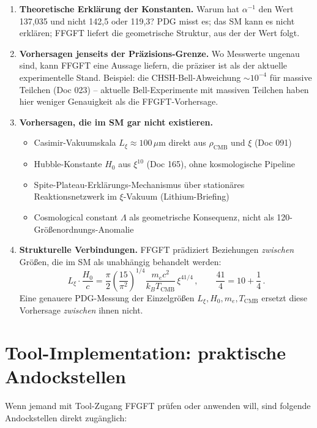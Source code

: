 \documentclass[11pt,a4paper]{article}
\begin{document}
\begin{enumerate}\itemsep2pt
\item \textbf{Theoretische Erklärung der Konstanten.} Warum hat $\alpha^{-1}$ den Wert 137,035 und nicht 142,5 oder 119,3? PDG misst es; das SM kann es nicht erklären; FFGFT liefert die geometrische Struktur, aus der der Wert folgt.

\item \textbf{Vorhersagen jenseits der Präzisions-Grenze.} Wo Messwerte ungenau sind, kann FFGFT eine Aussage liefern, die präziser ist als der aktuelle experimentelle Stand. Beispiel: die CHSH-Bell-Abweichung $\sim 10^{-4}$ für massive Teilchen (Doc 023) -- aktuelle Bell-Experimente mit massiven Teilchen haben hier weniger Genauigkeit als die FFGFT-Vorhersage.

\item \textbf{Vorhersagen, die im SM gar nicht existieren.}
\begin{itemize}\itemsep1pt
\item Casimir-Vakuumskala $L_\xi \approx 100\,\mu$m direkt aus $\rho_{\mathrm{CMB}}$ und $\xi$ (Doc 091)
\item Hubble-Konstante $H_0$ aus $\xi^{10}$ (Doc 165), ohne kosmologische Pipeline
\item Spite-Plateau-Erklärungs-Mechanismus über stationäres Reaktionsnetzwerk im $\xi$-Vakuum (Lithium-Briefing)
\item Cosmological constant $\Lambda$ als geometrische Konsequenz, nicht als 120-Größenordnungs-Anomalie
\end{itemize}

\item \textbf{Strukturelle Verbindungen.} FFGFT prädiziert Beziehungen \emph{zwischen} Größen, die im SM als unabhängig behandelt werden:
\[
L_\xi \cdot \frac{H_0}{c} = \frac{\pi}{2}\left(\frac{15}{\pi^2}\right)^{1/4}\frac{m_e c^2}{k_B T_{\mathrm{CMB}}}\,\xi^{41/4}\,, \qquad \frac{41}{4} = 10 + \frac{1}{4}\,.
\]
Eine genauere PDG-Messung der Einzelgrößen $L_\xi, H_0, m_e, T_{\mathrm{CMB}}$ ersetzt diese Vorhersage \emph{zwischen} ihnen nicht.
\end{enumerate}

\section{Tool-Implementation: praktische Andockstellen}

Wenn jemand mit Tool-Zugang FFGFT prüfen oder anwenden will, sind folgende Andockstellen direkt zugänglich:
\end{document}
